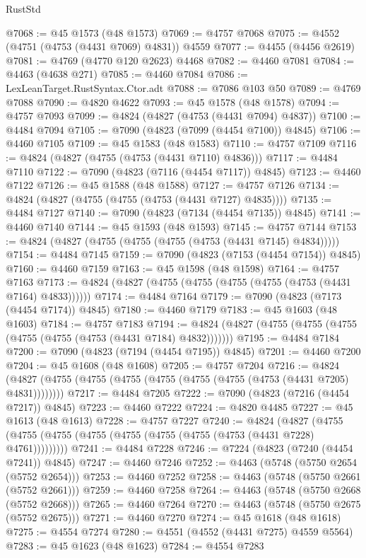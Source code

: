 \begin{lexlean}{RustStd}
\begin{coremodule}
@7068 := @45 @1573 (@48 @1573)
@7069 := @4757 @7068
@7075 := @4552 (@4751 (@4753 (@4431 @7069) @4831)) @4559
@7077 := @4455 (@4456 @2619)
@7081 := @4769 (@4770 @120 @2623) @4468
@7082 := @4460 @7081
@7084 := @4463 (@4638 @271)
@7085 := @4460 @7084
@7086 := LexLeanTarget.RustSyntax.Ctor.adt
@7088 := @7086 @103 @50
@7089 := @4769 @7088
@7090 := @4820 @4622
@7093 := @45 @1578 (@48 @1578)
@7094 := @4757 @7093
@7099 := @4824 (@4827 (@4753 (@4431 @7094) @4837))
@7100 := @4484 @7094
@7105 := @7090 (@4823 (@7099 (@4454 @7100)) @4845)
@7106 := @4460 @7105
@7109 := @45 @1583 (@48 @1583)
@7110 := @4757 @7109
@7116 := @4824 (@4827 (@4755 (@4753 (@4431 @7110) @4836)))
@7117 := @4484 @7110
@7122 := @7090 (@4823 (@7116 (@4454 @7117)) @4845)
@7123 := @4460 @7122
@7126 := @45 @1588 (@48 @1588)
@7127 := @4757 @7126
@7134 := @4824 (@4827 (@4755 (@4755 (@4753 (@4431 @7127) @4835))))
@7135 := @4484 @7127
@7140 := @7090 (@4823 (@7134 (@4454 @7135)) @4845)
@7141 := @4460 @7140
@7144 := @45 @1593 (@48 @1593)
@7145 := @4757 @7144
@7153 := @4824 (@4827 (@4755 (@4755 (@4755 (@4753 (@4431 @7145) @4834)))))
@7154 := @4484 @7145
@7159 := @7090 (@4823 (@7153 (@4454 @7154)) @4845)
@7160 := @4460 @7159
@7163 := @45 @1598 (@48 @1598)
@7164 := @4757 @7163
@7173 := @4824 (@4827 (@4755 (@4755 (@4755 (@4755 (@4753 (@4431 @7164) @4833))))))
@7174 := @4484 @7164
@7179 := @7090 (@4823 (@7173 (@4454 @7174)) @4845)
@7180 := @4460 @7179
@7183 := @45 @1603 (@48 @1603)
@7184 := @4757 @7183
@7194 := @4824 (@4827 (@4755 (@4755 (@4755 (@4755 (@4755 (@4753 (@4431 @7184) @4832)))))))
@7195 := @4484 @7184
@7200 := @7090 (@4823 (@7194 (@4454 @7195)) @4845)
@7201 := @4460 @7200
@7204 := @45 @1608 (@48 @1608)
@7205 := @4757 @7204
@7216 := @4824 (@4827 (@4755 (@4755 (@4755 (@4755 (@4755 (@4755 (@4753 (@4431 @7205) @4831))))))))
@7217 := @4484 @7205
@7222 := @7090 (@4823 (@7216 (@4454 @7217)) @4845)
@7223 := @4460 @7222
@7224 := @4820 @4485
@7227 := @45 @1613 (@48 @1613)
@7228 := @4757 @7227
@7240 := @4824
    (@4827 (@4755 (@4755 (@4755 (@4755 (@4755 (@4755 (@4755 (@4753 (@4431 @7228) @4761)))))))))
@7241 := @4484 @7228
@7246 := @7224 (@4823 (@7240 (@4454 @7241)) @4845)
@7247 := @4460 @7246
@7252 := @4463 (@5748 (@5750 @2654 (@5752 @2654)))
@7253 := @4460 @7252
@7258 := @4463 (@5748 (@5750 @2661 (@5752 @2661)))
@7259 := @4460 @7258
@7264 := @4463 (@5748 (@5750 @2668 (@5752 @2668)))
@7265 := @4460 @7264
@7270 := @4463 (@5748 (@5750 @2675 (@5752 @2675)))
@7271 := @4460 @7270
@7274 := @45 @1618 (@48 @1618)
@7275 := @4554 @7274
@7280 := @4551 (@4552 (@4431 @7275) @4559 @5564)
@7283 := @45 @1623 (@48 @1623)
@7284 := @4554 @7283

\end{coremodule}
\end{lexlean}
